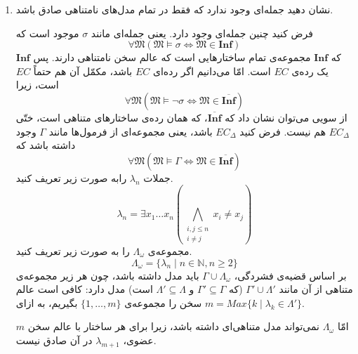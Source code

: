 \documentclass[12pt, 14paper]{article}
\begin{document}
\begin{enumerate}
\item نشان دهید جمله‌ای وجود ندارد که فقط در تمام مدل‌های نامتناهی صادق باشد.
\begin{ans}
  فرض کنید چنین جمله‌ای وجود دارد. یعنی جمله‌ای مانند $\sigma$ موجود است که
  $$ \forall \mathfrak{M} (\mathfrak{M} \vDash \sigma \iff \mathfrak{M} \in \mathbf{Inf}) $$
  که $\mathbf{Inf}$ مجموعه‌ی تمام ساختارهایی است که عالم سخن نامتناهی دارند. پس $\mathbf{Inf}$ یک رده‌ی $EC$ است. امّا می‌دانیم اگر رده‌ای $EC$ باشد، مکمّل آن هم حتماً $EC$ است، زیرا
  $$ \forall \mathfrak{M} (\mathfrak{M} \vDash \neg \sigma \iff \mathfrak{M} \in \overline{\mathbf{Inf}}) $$
  از سویی می‌توان نشان داد که $\overline{\mathbf{Inf}}$، که همان رده‌ی ساختارهای متناهی است، ختّی $EC_\Delta$ هم نیست. فرض کنید $EC_\Delta$ باشد، یعنی مجموعه‌ای از فرمول‌ها مانند $\Gamma$ وجود داشته باشد که
  $$ \forall \mathfrak{M} (\mathfrak{M} \vDash \Gamma \iff \mathfrak{M} \in \overline{\mathbf{Inf}}) $$
  جملات $\lambda_n$ رابه صورت زیر تعریف کنید.
  $$ \lambda_n = \exists x_1 \dots x_n (\bigwedge_{\substack{i,j \leq n \\ i \neq j}} x_i \neq x_j)  $$
  مجموعه‌ی $\Lambda_\omega$ را به صورت زیر تعریف کنید.
  $$ \Lambda_\omega = \{ \lambda_n \mid n \in \mathbb{N}, n \geq 2 \} $$
  بر اساس قضیه‌ی فشردگی، $\Gamma \cup \Lambda_\omega$ باید مدل داشته باشد، چون هر زیر مجموعه‌ی متناهی از آن مانند $\Gamma' \cup \Lambda'$ (که $\Gamma' \subseteq \Gamma$ و $\Lambda' \subseteq \Lambda$ است) مدل دارد: کافی است عالم سخن را مجموعه‌ی $\{ 1, \dots, m \}$ بگیریم، به ازای $m = Max\{k \mid \lambda_k \in \Lambda'\}$.

  امّا $\Lambda_\omega$ نمی‌تواند مدل متناهی‌ای داشته باشد، زیرا برای هر ساختار با عالم سخن $m$ عضوی، $\lambda_{m+1}$ در آن صادق نیست.
\end{ans}

\end{enumerate}
\end{document}

